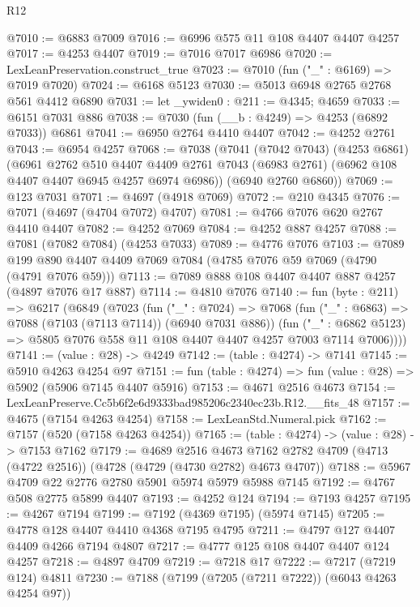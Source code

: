 \begin{lexlean}{R12}
\begin{coremodule}
@7010 := @6883 @7009
@7016 := @6996 @575 @11 @108 @4407 @4407 @4257
@7017 := @4253 @4407
@7019 := @7016 @7017 @6986
@7020 := LexLeanPreservation.construct_true
@7023 := @7010 (fun ("_" : @6169) => @7019 @7020)
@7024 := @6168 @5123
@7030 := @5013 @6948 @2765 @2768 @561 @4412 @6890
@7031 := let _ywiden0 : @211 := @4345; @4659
@7033 := @6151 @7031 @886
@7038 := @7030 (fun (__b : @4249) => @4253 (@6892 @7033)) @6861
@7041 := @6950 @2764 @4410 @4407
@7042 := @4252 @2761
@7043 := @6954 @4257
@7068 := @7038
    (@7041
      (@7042 @7043)
      (@4253 @6861)
      (@6961
        @2762
        @510
        @4407
        @4409
        @2761
        @7043
        (@6983 @2761)
        (@6962 @108 @4407 @4407 @6945 @4257 @6974 @6986))
      (@6940 @2760 @6860))
@7069 := @123 @7031
@7071 := @4697 (@4918 @7069)
@7072 := @210 @4345
@7076 := @7071 (@4697 (@4704 @7072) @4707)
@7081 := @4766 @7076 @620 @2767 @4410 @4407
@7082 := @4252 @7069
@7084 := @4252 @887 @4257
@7088 := @7081 (@7082 @7084) (@4253 @7033)
@7089 := @4776 @7076
@7103 := @7089 @199 @890 @4407 @4409 @7069 @7084 (@4785 @7076 @59 @7069 (@4790 (@4791 @7076 @59)))
@7113 := @7089 @888 @108 @4407 @4407 @887 @4257 (@4897 @7076 @17 @887)
@7114 := @4810 @7076
@7140 := fun (byte : @211) =>
  @6217
    (@6849
      (@7023
        (fun ("_" : @7024) =>
        @7068
          (fun ("_" : @6863) => @7088 (@7103 (@7113 @7114)) (@6940 @7031 @886))
          (fun ("_" : @6862 @5123) =>
          @5805 @7076 @558 @11 @108 @4407 @4407 @4257 @7003 @7114 @7006))))
@7141 := (value : @28) -> @4249
@7142 := (table : @4274) -> @7141
@7145 := @5910 @4263 @4254 @97
@7151 := fun (table : @4274) => fun (value : @28) => @5902 (@5906 @7145 @4407 @5916)
@7153 := @4671 @2516 @4673
@7154 := LexLeanPreserve.Cc5b6f2e6d9333bad985206c2340ec23b.R12.__fits_48
@7157 := @4675 (@7154 @4263 @4254)
@7158 := LexLeanStd.Numeral.pick
@7162 := @7157 (@520 (@7158 @4263 @4254))
@7165 := (table : @4274) -> (value : @28) -> @7153 @7162
@7179 := @4689
    @2516
    @4673
    @7162
    @2782
    @4709
    (@4713 (@4722 @2516))
    (@4728 (@4729 (@4730 @2782) @4673 @4707))
@7188 := @5967 @4709 @22 @2776 @2780 @5901 @5974 @5979 @5988 @7145
@7192 := @4767 @508 @2775 @5899 @4407
@7193 := @4252 @124
@7194 := @7193 @4257
@7195 := @4267 @7194
@7199 := @7192 (@4369 @7195) (@5974 @7145)
@7205 := @4778 @128 @4407 @4410 @4368 @7195 @4795
@7211 := @4797 @127 @4407 @4409 @4266 @7194 @4807
@7217 := @4777 @125 @108 @4407 @4407 @124 @4257
@7218 := @4897 @4709
@7219 := @7218 @17
@7222 := @7217 (@7219 @124) @4811
@7230 := @7188 (@7199 (@7205 (@7211 @7222)) (@6043 @4263 @4254 @97))

\end{coremodule}
\end{lexlean}
